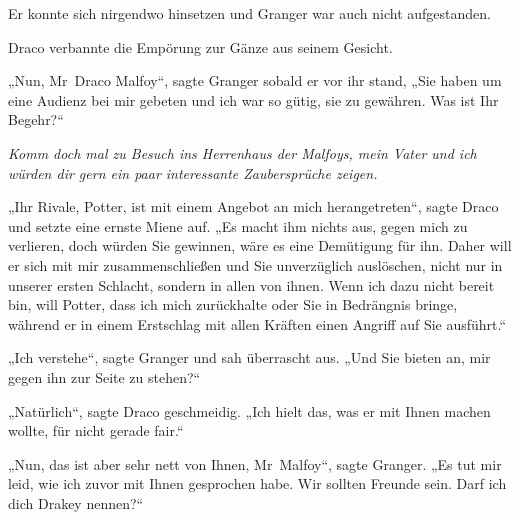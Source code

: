 Er konnte sich nirgendwo hinsetzen und Granger war auch nicht aufgestanden.

Draco verbannte die Empörung zur Gänze aus seinem Gesicht.

„Nun, Mr~Draco Malfoy“, sagte Granger sobald er vor ihr stand, „Sie haben um eine Audienz bei mir gebeten und ich war so gütig, sie zu gewähren. Was ist Ihr Begehr?“

\emph{Komm doch mal zu Besuch ins Herrenhaus der Malfoys, mein Vater und ich würden dir gern ein paar interessante Zaubersprüche zeigen.}

„Ihr Rivale, Potter, ist mit einem Angebot an mich herangetreten“, sagte Draco und setzte eine ernste Miene auf. „Es macht ihm nichts aus, gegen mich zu verlieren, doch würden Sie gewinnen, wäre es eine Demütigung für ihn. Daher will er sich mit mir zusammenschließen und Sie unverzüglich auslöschen, nicht nur in unserer ersten Schlacht, sondern in allen von ihnen. Wenn ich dazu nicht bereit bin, will Potter, dass ich mich zurückhalte oder Sie in Bedrängnis bringe, während er in einem Erstschlag mit allen Kräften einen Angriff auf Sie ausführt.“

„Ich verstehe“, sagte Granger und sah überrascht aus. „Und Sie bieten an, mir gegen ihn zur Seite zu stehen?“

„Natürlich“, sagte Draco geschmeidig. „Ich hielt das, was er mit Ihnen machen wollte, für nicht gerade fair.“

„Nun, das ist aber sehr nett von Ihnen, Mr~Malfoy“, sagte Granger. „Es tut mir leid, wie ich zuvor mit Ihnen gesprochen habe. Wir sollten Freunde sein. Darf ich dich Drakey nennen?“


